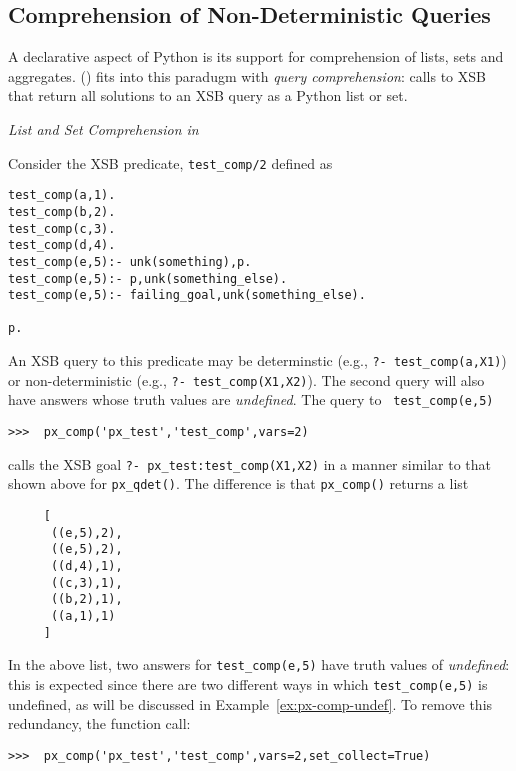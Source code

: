 \subsection{Comprehension of Non-Deterministic Queries}

A declarative aspect of Python is its support for comprehension of
lists, sets and aggregates.  \px() fits into this paradugm with {\em
  query comprehension}: calls to XSB that return all solutions to an
XSB query as a Python list or set.

\begin{example} \rm {\it List and Set Comprehension in \px{}} \label{ex:list-comp-1}

  Consider the XSB predicate, {\tt test\_comp/2} defined as

{\small  
\begin{verbatim}  
test_comp(a,1).
test_comp(b,2).
test_comp(c,3).
test_comp(d,4).
test_comp(e,5):- unk(something),p.
test_comp(e,5):- p,unk(something_else).
test_comp(e,5):- failing_goal,unk(something_else).

p.
\end{verbatim}
}

\noindent
An XSB query to this predicate may be determinstic (e.g., {\tt ?-
  test\_comp(a,X1)}) or non-deterministic (e.g., {\tt ?-
  test\_comp(X1,X2)}).  The second query will also have answers whose
truth values are {\em undefined}.  The \px{} query to {\tt
  test\_comp(e,5)}

\begin{verbatim}
>>>  px_comp('px_test','test_comp',vars=2)
\end{verbatim}

\noindent
calls the XSB goal {\tt ?- px\_test:test\_comp(X1,X2)} in a manner
similar to that shown above for {\tt px\_qdet()}.  The difference is
that {\tt px\_comp()} returns a list

{\small  
\begin{verbatim}
     [
      ((e,5),2),
      ((e,5),2),
      ((d,4),1),
      ((c,3),1),
      ((b,2),1),
      ((a,1),1) 
     ]
\end{verbatim}
}

\noindent
In the above list, two answers for {\tt test\_comp(e,5)} have truth
values of {\em undefined}: this is expected since there are two
different ways in which {\tt test\_comp(e,5)} is undefined, as will be
discussed in Example~\ref{ex:px-comp-undef}.  To remove this
redundancy, the function call:

\begin{verbatim}
>>>  px_comp('px_test','test_comp',vars=2,set_collect=True)
\end{verbatim}


\end{example}
